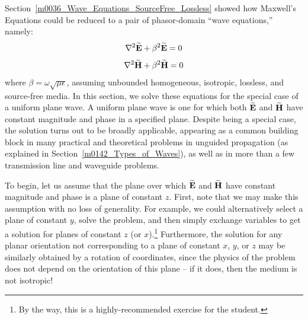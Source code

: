 

\label{m0038_Uniform_Plane_Waves_Derivation} %

Section~\ref{m0036_Wave_Equations_SourceFree_Lossless} showed how Maxwell's Equations could be reduced to a pair of phasor-domain ``wave equations,'' namely:
%
\begin{equation}
\nabla^2\widetilde{\bf E} +\beta^2 \widetilde{\bf E} = 0 
\label{m0038_eWEE2}
\end{equation}
%
\begin{equation}
\nabla^2\widetilde{\bf H} +\beta^2 \widetilde{\bf H} = 0 
\label{m0038_eWEH2}
\end{equation}
%
where $\beta=\omega\sqrt{\mu\epsilon}$, assuming unbounded homogeneous, isotropic, lossless, and source-free media.
In this section, we solve these equations for the special case of a uniform plane wave.
A uniform plane wave is one for which both $\widetilde{\bf E}$ and $\widetilde{\bf H}$ have constant magnitude and phase in a specified plane.  
Despite being a special case, the solution turns out to be broadly applicable, appearing as a common building block in many practical and theoretical problems in unguided propagation (as explained in Section~\ref{m0142_Types_of_Waves}), as well as in more than a few transmission line and waveguide problems.

To begin, let us assume that the plane over which $\widetilde{\bf E}$ and $\widetilde{\bf H}$ have constant magnitude and phase is a plane of constant $z$. 
First, note that we may make this assumption with no loss of generality.
For example, we could alternatively select a plane of constant $y$, solve the problem, and then simply exchange variables to get a solution for planes of constant $z$ (or $x$).\footnote{By the way, this is a highly-recommended exercise for the student.}
Furthermore, the solution for any planar orientation not corresponding to a plane of constant $x$, $y$, or $z$ may be similarly obtained by a rotation of coordinates, since the physics of the problem does not depend on the orientation of this plane -- if it does, then the medium is not isotropic!
 
